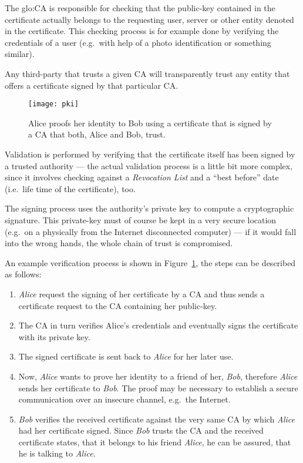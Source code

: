 The \gls{glo:CA} is responsible for checking that the public-key contained
in  the certificate  actually belongs  to the  requesting user,  server or
other  entity denoted  in the  certificate. This  checking process  is for
example done by  verifying the credentials of a user  (e.g.~with help of a
photo identification or something similar).

Any third-party that trusts a given CA will transparently trust any entity
that offers a certificate signed by that particular CA.

\begin{figure}[h]
  \begin{center}
    \texttt{[image: pki]}
  \end{center}
  \caption[Public  Key Infrastructure]{Alice  proofs her  identity  to Bob
    using a certificate  that is signed by a CA that  both, Alice and Bob,
    trust.}
  \label{fig:pki}
\end{figure}

Validation is performed by verifying  that the certificate itself has been
signed  by a  trusted authority  --- the  actual validation  process  is a
little   bit  more  complex,   since  it   involves  checking   against  a
\emph{Revocation List} and  a ``best before'' date (i.e.~life  time of the
certificate), too.

The  signing  process  uses  the  authority's private  key  to  compute  a
cryptographic signature. This private-key must of course be kept in a very
secure  location  (e.g.~on a  physically  from  the Internet  disconnected
computer) ---  if it would fall into  the wrong hands, the  whole chain of
trust is compromised.

An  example verification  process  is shown  in Figure~\ref{fig:pki},  the
steps can be described as follows:
\begin{enumerate}
\item \emph{Alice} request the signing of her certificate by a CA and thus
  sends a certificate request to the CA containing her public-key.
\item The CA in turn verifies Alice's credentials and eventually signs the
  certificate with its private key.
\item The signed certificate is sent back to \emph{Alice} for her later use.
\item Now,  \emph{Alice} wants to prove  her identity to a  friend of her,
  \emph{Bob},   therefore   \emph{Alice}    sends   her   certificate   to
  \emph{Bob}.  The   proof  may  be   necessary  to  establish   a  secure
  communication over an insecure channel, e.g.~the Internet.
\item \emph{Bob}  verifies the received certificate against  the very same
  CA by  which \emph{Alice} had her certificate  signed.  Since \emph{Bob}
  trusts the  CA and the received  certificate states, that  it belongs to
  his  friend \emph{Alice},  he  can be  assured,  that he  is talking  to
  \emph{Alice}.
\end{enumerate}

